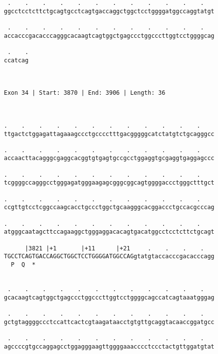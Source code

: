\documentclass{article}
\begin{document}
\begin{Verbatim}
 .    .    .    .    .    .    .    .    .    .    .    .   
ggcctcctcttctgcagtgcctcagtgaccaggctggctcctggggatggccaggtatgt
                                                            
 .    .    .    .    .    .    .    .    .    .    .    .   
accacccgacacccagggcacaagtcagtggctgagccctggcccttggtcctggggcag
                                                            
 .    .
ccatcag
       
       
 
Exon 34 | Start: 3870 | End: 3906 | Length: 36



.    .    .    .    .    .    .    .    .    .    .    .    
ttgactctggagattagaaagccctgcccctttgacgggggcatctatgtctgcagggcc
                                                            
.    .    .    .    .    .    .    .    .    .    .    .    
accaacttacagggcgaggcacggtgtgagtgccgcctggaggtgcgaggtgaggagccc
                                                            
.    .    .    .    .    .    .    .    .    .    .    .    
tcggggccagggcctgggagatgggaagagcgggcggcagtggggaccctgggctttgct
                                                            
.    .    .    .    .    .    .    .    .    .    .    .    
ccgttgtcctcggccaagcacctgccctggctgcaagggcacggaccctgccacgcccag
                                                            
.    .    .    .    .    .    .    .    .    .    .    .    
atgggcaatagcttccagaaggctgggaggacacagtgacatggcctcctcttctgcagt
                                                            
      |3821 |+1       |+11      |+21     .    .    .    .   
TGCCTCAGTGACCAGGCTGGCTCCTGGGGATGGCCAGgtatgtaccacccgacacccagg
  P  Q  *                          
                                                            
  
 .    .    .    .    .    .    .    .    .    .    .    .   
gcacaagtcagtggctgagccctggcccttggtcctggggcagccatcagtaaatgggag
                                                            
 .    .    .    .    .    .    .    .    .    .    .    .   
gctgtaggggccctccattcactcgtaagataacctgtgttgcaggtacaaccggatgcc
                                                            
 .    .    .    .    .    .    .    .    .    .    .    .   
agccccgtgccaggagcctggagggaagttggggaaacccctccctactgttggatgtat
                                                            

\end{Verbatim}
\end{document}
